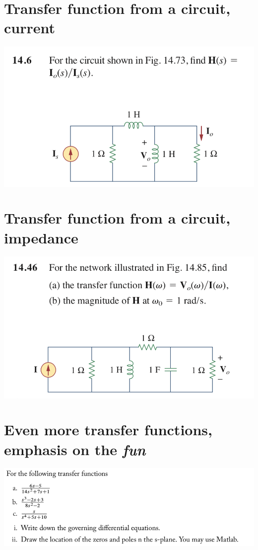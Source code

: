 \documentclass[11pt]{book}
\begin{document}
\newpage

\section{Transfer function from a circuit, current}
\begin{center}
	\includegraphics[width=\textwidth]{figures/q3.30.png} 
\end{center}

\newpage

\section{Transfer function from a circuit, impedance}
\begin{center}
	\includegraphics[width=\textwidth]{figures/q3.33.png} 
\end{center}

\newpage

\section{Even more transfer functions, emphasis on the \textit{fun}}
\begin{center}
	\includegraphics[width=\textwidth]{figures/q3.15.png}
\end{center}
\end{document}
